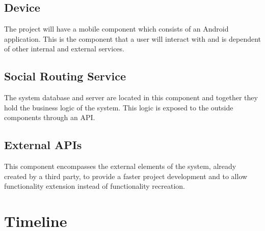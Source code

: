 \documentclass{article}
\begin{document}
        \subsection{Device}  
            The project will have a mobile component which consists of an Android application. 
            This is the component that a user will interact with and is dependent of other internal and external services.
        \subsection{Social Routing Service}
            The system database and server are located in this component and together they hold the business logic of the system.
            This logic is exposed to the outside components through an API.
        \subsection{External APIs}
            This component encompasses the external elements of the system, already created by a third party, to provide a faster project development
            and to allow functionality extension instead of functionality recreation. 
    \section{Timeline}   
\end{document}
